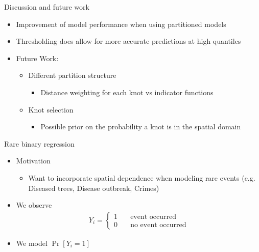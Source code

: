 \documentclass{beamer}
\begin{document}
\begin{frame}{Discussion and future work}
  \begin{itemize} \setlength{\itemsep}{1em}
    \item Improvement of model performance when using partitioned models
    \item Thresholding does allow for more accurate predictions at high quantiles
    \item Future Work: \vspace{0.5em}
    \begin{itemize} \setlength{\itemsep}{0.5em}
      \item Different partition structure \vspace{0.25em}
      \begin{itemize} \setlength{\itemsep}{0.5em}
        \item Distance weighting for each knot vs indicator functions
      \end{itemize}
      \item Knot selection \vspace{0.25em}
      \begin{itemize} \setlength{\itemsep}{0.5em}
        \item Possible prior on the probability a knot is in the spatial domain
      \end{itemize}
    \end{itemize}
  \end{itemize}
\end{frame}

\begin{frame}{Rare binary regression}
  \begin{itemize} \setlength{\itemsep}{1em}
    \item Motivation \vspace{0.5em}
    \begin{itemize} \setlength{\itemsep}{0.5em}
      \item Want to incorporate spatial dependence when modeling rare events (e.g. Diseased trees, Disease outbreak, Crimes)
    \end{itemize}
    \item We observe
    \begin{align*}
      Y_i = \left\{ \begin{array}{ll}
        1 \quad & \text{event occurred}\\
        0 \quad & \text{no event occurred}
      \end{array} \right.
    \end{align*}
    \item We model $\Pr[Y_i = 1]$
  \end{itemize}
\end{frame}
\end{document}

